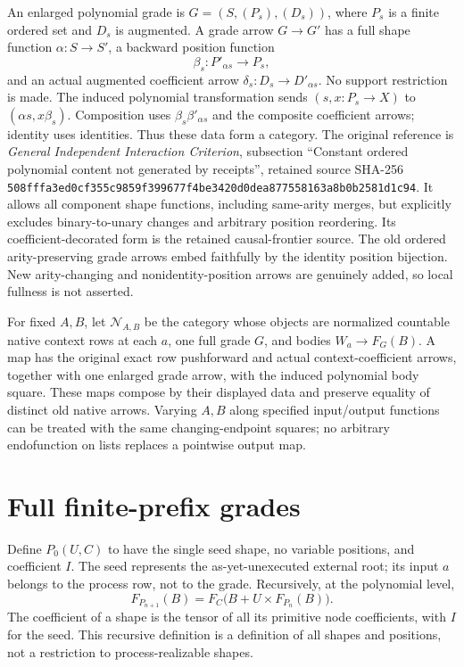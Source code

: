 \documentclass[11pt]{article}
\begin{document}
An enlarged polynomial grade is $G=(S,(P_s),(D_s))$, where $P_s$ is a finite ordered set and $D_s$ is augmented. A grade arrow $G\to G'$ has a full shape function $\alpha:S\to S'$, a backward position function
\[
 \beta_s:P'_{\alpha s}\longrightarrow P_s,
\]
and an actual augmented coefficient arrow $\delta_s:D_s\to D'_{\alpha s}$. No support restriction is made. The induced polynomial transformation sends $(s,x:P_s\to X)$ to $(\alpha s,x\beta_s)$. Composition uses $\beta_s\beta'_{\alpha s}$ and the composite coefficient arrows; identity uses identities. Thus these data form a category. The original reference is \emph{General Independent Interaction Criterion}, subsection ``Constant ordered polynomial content not generated by receipts'', retained source SHA-256 \texttt{508fffa3ed0cf355c9859f399677f4be3420d0dea877558163a8b0b2581d1c94}. It allows all component shape functions, including same-arity merges, but explicitly excludes binary-to-unary changes and arbitrary position reordering. Its coefficient-decorated form is the retained causal-frontier source. The old ordered arity-preserving grade arrows embed faithfully by the identity position bijection. New arity-changing and nonidentity-position arrows are genuinely added, so local fullness is not asserted.

For fixed $A,B$, let $\mathcal N_{A,B}$ be the category whose objects are normalized countable native context rows at each $a$, one full grade $G$, and bodies $W_a\to F_G(B)$. A map has the original exact row pushforward and actual context-coefficient arrows, together with one enlarged grade arrow, with the induced polynomial body square. These maps compose by their displayed data and preserve equality of distinct old native arrows. Varying $A,B$ along specified input/output functions can be treated with the same changing-endpoint squares; no arbitrary endofunction on lists replaces a pointwise output map.

\section{Full finite-prefix grades}
Define $P_0(U,C)$ to have the single seed shape, no variable positions, and coefficient $I$. The seed represents the as-yet-unexecuted external root; its input $a$ belongs to the process row, not to the grade. Recursively, at the polynomial level,
\[
 F_{P_{n+1}}(B)=F_C\bigl(B+U\times F_{P_n}(B)\bigr).       \tag{1}
\]
The coefficient of a shape is the tensor of all its primitive node coefficients, with $I$ for the seed. This recursive definition is a definition of all shapes and positions, not a restriction to process-realizable shapes.
\end{document}
